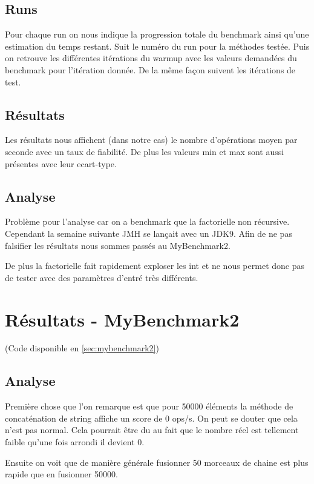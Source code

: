 \documentclass{report}
\begin{document}
			\subsection{Runs}
				Pour chaque run on nous indique la progression totale du benchmark ainsi qu'une estimation du temps restant.
				Suit le numéro du run pour la méthodes testée.
				Puis on retrouve les différentes itérations du warmup avec les valeurs demandées du benchmark pour l'itération donnée.
				De la même façon suivent les itérations de test.
			
			\subsection{Résultats}
				Les résultats nous affichent (dans notre cas) le nombre d'opérations moyen par seconde avec un taux de fiabilité.
				De plus les valeurs min et max sont aussi présentes avec leur ecart-type.
				
			\subsection{Analyse}
				Problème pour l'analyse car on a benchmark que la factorielle non récursive.
				Cependant la semaine suivante JMH se lançait avec un JDK9.
				Afin de ne pas falsifier les résultats nous sommes passés au MyBenchmark2.
				
				De plus la factorielle fait rapidement exploser les int et ne nous permet donc pas de tester avec des paramètres d'entré très différents.
		
		\section{Résultats - MyBenchmark2}
			(Code disponible en \autoref{sec:mybenchmark2})
			
			\subsection{Analyse}
				Première chose que l'on remarque est que pour 50000 éléments la méthode de concaténation de string affiche un score de 0 ops/s.
				On peut se douter que cela n'est pas normal.
				Cela pourrait être du au fait que le nombre réel est tellement faible qu'une fois arrondi il devient 0.
				
				Ensuite on voit que de manière générale fusionner 50 morceaux de chaine est plus rapide que en fusionner 50000.
				
\end{document}
